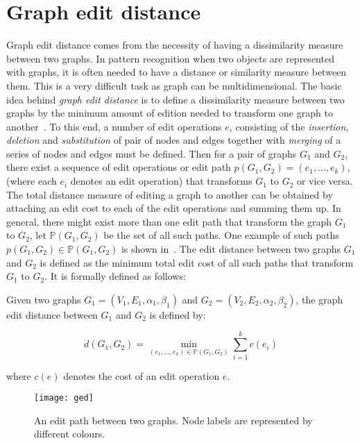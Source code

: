 \section{Graph edit distance}
\label{sec:gm:ged}
Graph edit distance comes from the necessity of having a dissimilarity measure between two graphs. In pattern recognition when two objects are represented with graphs, it is often needed to have a distance or similarity measure between them. This is a very difficult task as graph can be multidimensional. The basic idea behind \emph{graph edit distance} is to define a dissimilarity measure between two graphs by the minimum amount of edition needed to transform one graph to another~\cite{Tsai1979}. To this end, a number of edit operations $e$, consisting of the \emph{insertion}, \emph{deletion} and \emph{substitution} of pair of nodes and edges together with \emph{merging} of a series of nodes and edges must be defined. Then for a pair of graphs $G_1$ and $G_2$, there exist a sequence of edit operations or edit path $p(G_1,G_2)=(e_1,\dots,e_k)$, (where each $e_i$ denotes an edit operation) that transforms $G_1$ to $G_2$ or vice versa. The total distance measure of editing a graph to another can be obtained by attaching an edit cost to each of the edit operations and summing them up. In general, there might exist more than one edit path that transform the graph $G_1$ to $G_2$, let $\mathbb{P}(G_1,G_2)$ be the set of all such paths. One example of such paths $p(G_1,G_2)\in\mathbb{P}(G_1,G_2)$ is shown in~. The edit distance between two graphs $G_1$ and $G_2$ is defined as the minimum total edit cost of all such paths that transform $G_1$ to $G_2$. It is formally defined as follows:

\begin{definition}
Given two graphs $G_1=(V_1,E_1,\alpha_1,\beta_1)$ and $G_2=(V_2,E_2,\alpha_2,\beta_2)$, the graph edit distance between $G_1$ and $G_2$ is defined by:

\[
d(G_1,G_2)=\min_{(e_1,\dots,e_k)\in\mathbb{P}(G_1,G_2)}\sum_{i=1}^{k}c(e_i)
\]

where $c(e)$ denotes the cost of an edit operation $e$.
\end{definition}

\begin{figure}
\texttt{[image: ged]}
\caption{An edit path between two graphs. Node labels are represented by different colours.}
\label{fig:gm:ged}
\end{figure}

